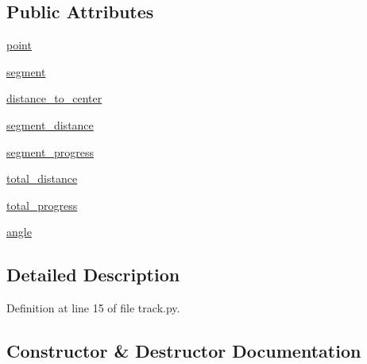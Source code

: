 \subsection*{Public Attributes}
\begin{DoxyCompactItemize}
\item 
\hyperlink{classsimulation__tools_1_1track_1_1_track_position_a5c5ad2aecf6e00e6611e8ad70b38de7b}{point}
\item 
\hyperlink{classsimulation__tools_1_1track_1_1_track_position_ab5feb6f2789576c88fe7310f28e4c4db}{segment}
\item 
\hyperlink{classsimulation__tools_1_1track_1_1_track_position_a1d45644ad2113e0c7a8e546f52015d46}{distance\+\_\+to\+\_\+center}
\item 
\hyperlink{classsimulation__tools_1_1track_1_1_track_position_a89c184a72d3b1636bf9531de144374e4}{segment\+\_\+distance}
\item 
\hyperlink{classsimulation__tools_1_1track_1_1_track_position_a1ce2f49333cc2e6d5ac1094a3e919eeb}{segment\+\_\+progress}
\item 
\hyperlink{classsimulation__tools_1_1track_1_1_track_position_a488a7374a672827079686cf7fece12ee}{total\+\_\+distance}
\item 
\hyperlink{classsimulation__tools_1_1track_1_1_track_position_a0471b3519ccab2dfd048ed02853f8a8d}{total\+\_\+progress}
\item 
\hyperlink{classsimulation__tools_1_1track_1_1_track_position_a4809c7245ab044b2b3ca96fbdc80fe72}{angle}
\end{DoxyCompactItemize}


\subsection{Detailed Description}


Definition at line 15 of file track.\+py.



\subsection{Constructor \& Destructor Documentation}
